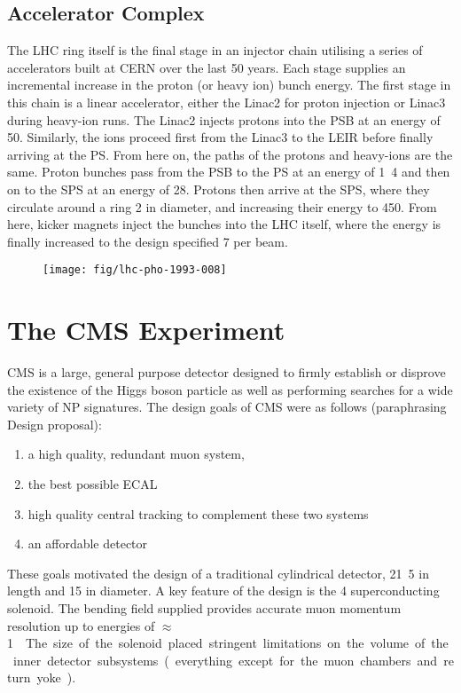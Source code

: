 \subsection{Accelerator Complex}
The \ac{LHC} ring itself is the final stage in an injector chain utilising a
series of accelerators built at CERN over the last 50 years. Each stage supplies
an incremental increase in the proton (or heavy ion) bunch energy. The first
stage in this chain is a linear accelerator, either the Linac2 for proton
injection or Linac3 during heavy-ion runs. The Linac2 injects protons into the
\ac{PSB} at an energy of \unit{50}{\mega\electronvolt}. Similarly, the ions
proceed first from the Linac3 to the \ac{LEIR} before finally arriving at the
\ac{PS}. From here on, the paths of the protons and heavy-ions are the
same. Proton bunches pass from the \ac{PSB} to the \ac{PS} at an energy of
\unit{1.4}{\giga\electronvolt} and then on to the \ac{SPS} at an energy of
\unit{28}{\giga\electronvolt}. Protons then arrive at the \ac{SPS}, where they
circulate around a ring \unit{2}{\kilo\metre} in diameter, and increasing their
energy to \unit{450}{\giga\electronvolt}. From here, kicker magnets inject the
bunches into the \ac{LHC} itself, where the energy is finally increased to the
design specified \unit{7}{\TeV} per beam.
\begin{figure}
\texttt{[image: fig/lhc-pho-1993-008]}
\end{figure}



\section{The \acl{CMS} Experiment}
\ac{CMS} is a large, general purpose detector designed to firmly establish or
disprove the existence of the Higgs boson particle as well as performing
searches for a wide variety of \ac{NP} signatures. The design goals of CMS were
as follows (paraphrasing Design proposal):
\begin{enumerate}
\item a high quality, redundant muon system,
\item the best possible \ac{ECAL}
\item high quality central tracking to complement these two systems
\item an affordable detector
\end{enumerate}

These goals motivated the design of a traditional cylindrical detector,
\unit{21.5}{\metre} in length and \unit{15}{\metre} in diameter. A key feature
of the design is the \unit{4}{\tesla} superconducting solenoid. The bending
field supplied provides accurate muon momentum resolution up to energies of
\unit{$\approx$ 1}{\TeV}. The size of the solenoid placed stringent
limitations on the volume of the inner detector subsystems (everything except
for the muon chambers and return yoke).

